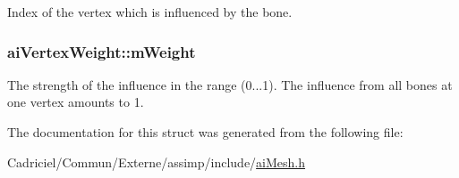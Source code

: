 Index of the vertex which is influenced by the bone. 

\hypertarget{structai_vertex_weight_abab9c49baabc2cafef9ac840f59e61b8}{
\subsubsection[{m\-Weight}]{ ai\-Vertex\-Weight\-::m\-Weight}}\label{structai_vertex_weight_abab9c49baabc2cafef9ac840f59e61b8}
The strength of the influence in the range (0...1). The influence from all bones at one vertex amounts to 1. 

The documentation for this struct was generated from the following file\-:\begin{DoxyCompactItemize}
\item 
Cadriciel/\-Commun/\-Externe/assimp/include/\hyperlink{ai_mesh_8h}{ai\-Mesh.\-h}\end{DoxyCompactItemize}

